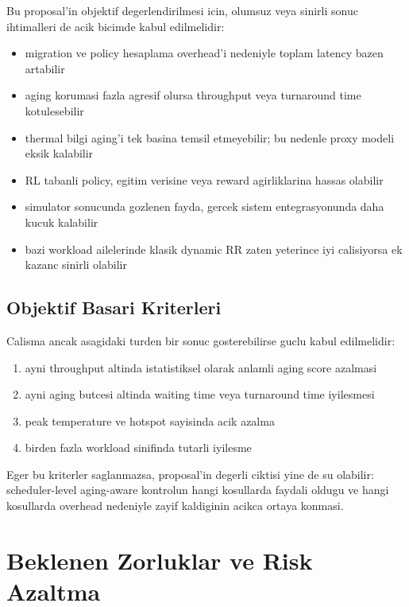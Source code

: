 \documentclass[12pt,a4paper]{article}
\begin{document}
Bu proposal'in objektif degerlendirilmesi icin, olumsuz veya sinirli sonuc ihtimalleri de acik bicimde kabul edilmelidir:

\begin{itemize}[leftmargin=*]
\item migration ve policy hesaplama overhead'i nedeniyle toplam latency bazen artabilir
\item aging korumasi fazla agresif olursa throughput veya turnaround time kotulesebilir
\item thermal bilgi aging'i tek basina temsil etmeyebilir; bu nedenle proxy modeli eksik kalabilir
\item RL tabanli policy, egitim verisine veya reward agirliklarina hassas olabilir
\item simulator sonucunda gozlenen fayda, gercek sistem entegrasyonunda daha kucuk kalabilir
\item bazi workload ailelerinde klasik dynamic RR zaten yeterince iyi calisiyorsa ek kazanc sinirli olabilir
\end{itemize}

\subsection{Objektif Basari Kriterleri}

Calisma ancak asagidaki turden bir sonuc gosterebilirse guclu kabul edilmelidir:

\begin{enumerate}[leftmargin=*]
\item ayni throughput altinda istatistiksel olarak anlamli aging score azalmasi
\item ayni aging butcesi altinda waiting time veya turnaround time iyilesmesi
\item peak temperature ve hotspot sayisinda acik azalma
\item birden fazla workload sinifinda tutarli iyilesme
\end{enumerate}

Eger bu kriterler saglanmazsa, proposal'in degerli ciktisi yine de su olabilir: scheduler-level aging-aware kontrolun
hangi kosullarda faydali oldugu ve hangi kosullarda overhead nedeniyle zayif kaldiginin acikca ortaya konmasi.

\section{Beklenen Zorluklar ve Risk Azaltma}
\end{document}
